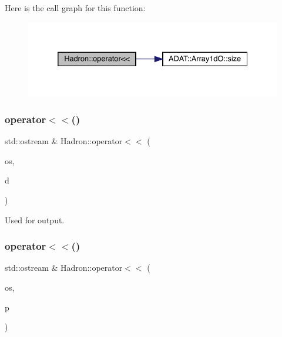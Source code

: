 Here is the call graph for this function\+:\nopagebreak
\begin{figure}[H]
\begin{center}
\leavevmode
\includegraphics[width=332pt]{d1/daf/namespaceHadron_a0dfff614f40f815cfb78d828c07bc8aa_cgraph}
\end{center}
\end{figure}
\mbox{\label{namespaceHadron_ac4fad3eded4cdc1e5e3a20c089ff92c7}} 
\subsubsection{\texorpdfstring{operator$<$$<$()}{operator<<()}\hspace{0.1cm}{\footnotesize\ttfamily [36/48]}}
{\footnotesize\ttfamily std\+::ostream \& Hadron\+::operator$<$$<$ (\begin{DoxyParamCaption}\item[{std\+::ostream \&}]{os,  }\item[{const \mbox{\hyperlink{structHadron_1_1HadronVertex__t}{Hadron\+Vertex\+\_\+t}} \&}]{d }\end{DoxyParamCaption})}



Used for output. 

\mbox{\label{namespaceHadron_a7fed56ec5f5f96e9e160939d5b138184}} 
\subsubsection{\texorpdfstring{operator$<$$<$()}{operator<<()}\hspace{0.1cm}{\footnotesize\ttfamily [37/48]}}
{\footnotesize\ttfamily std\+::ostream \& Hadron\+::operator$<$$<$ (\begin{DoxyParamCaption}\item[{std\+::ostream \&}]{os,  }\item[{const \mbox{\hyperlink{structHadron_1_1HadronDiagramTimeSlices__t}{Hadron\+Diagram\+Time\+Slices\+\_\+t}} \&}]{p }\end{DoxyParamCaption})}

